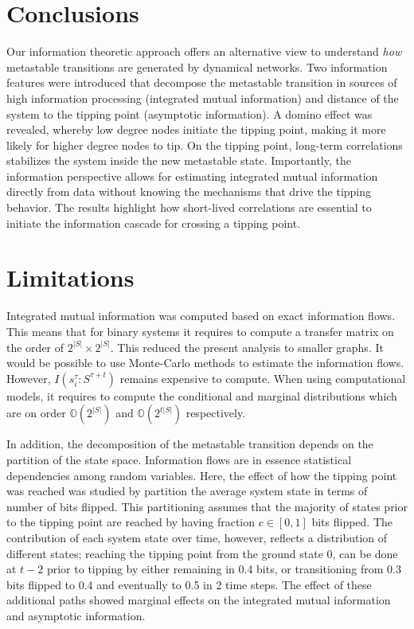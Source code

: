 \documentclass[a4paper, 11pt, twocolumn]{article}
\begin{document}
\section{Conclusions}
\label{sec:org7971cd6}
Our  information theoretic  approach  offers an  alternative
view   to  understand   \emph{how}  metastable   transitions  are
generated  by dynamical  networks. Two  information features
were introduced that decompose  the metastable transition in
sources  of high  information processing  (integrated mutual
information) and distance of the system to the tipping point
(asymptotic  information).  A  domino effect  was  revealed,
whereby low degree nodes  initiate the tipping point, making
it  more likely  for  higher  degree nodes  to  tip. On  the
tipping point, long-term  correlations stabilizes the system
inside   the   new   metastable  state.   Importantly,   the
information  perspective  allows for  estimating  integrated
mutual information  directly from  data without  knowing the
mechanisms  that drive  the  tipping  behavior. The  results
highlight  how  short-lived  correlations are  essential  to
initiate  the information  cascade  for  crossing a  tipping
point.

\section{Limitations}
\label{sec:org26f073f}
Integrated mutual  information was  computed based  on exact
information  flows. This  means that  for binary  systems it
requires  to  compute a  transfer  matrix  on the  order  of
\(2^{|S|} \times 2^{|S|}\). This  reduced the present analysis to
smaller  graphs. It  would  be possible  to use  Monte-Carlo
methods   to  estimate   the  information   flows.  However,
\(I(s_i^{\tau}  : S^{\tau  + t})\)  remains expensive  to compute.
When using computational models,  it requires to compute the
conditional and  marginal distributions  which are  on order
\(\mathbb{O}(2^{|S|})\)       and       \(\mathbb{O}(2^{t|S|})\)
respectively.

In addition, the decomposition  of the metastable transition
depends  on the  partition of  the state  space. Information
flows are  in essence statistical dependencies  among random
variables. Here,  the effect  of how  the tipping  point was
reached was studied by partition the average system state in
terms of  number of bits flipped.  This partitioning assumes
that the majority  of states prior to the  tipping point are
reached by having fraction \(c  \in [0, 1]\) bits flipped. The
contribution  of  each  system  state  over  time,  however,
reflects a  distribution of  different states;  reaching the
tipping  point from  the  ground  state 0,  can  be done  at
\(t-2\) prior to tipping by either remaining in 0.4 bits, or
transitioning from 0.3 bits flipped to 0.4 and eventually to
0.5 in  2 time steps.  The effect of these  additional paths
showed marginal effects on the integrated mutual information
and asymptotic information.
\end{document}
